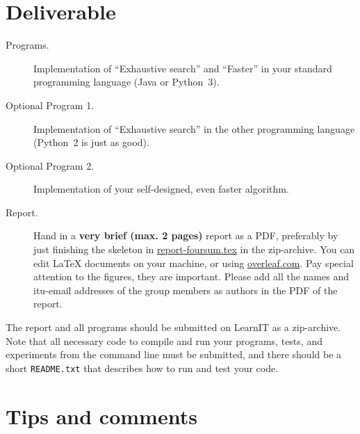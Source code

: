 \documentclass{tufte-handout}
\begin{document}
\section{Deliverable}
\begin{description}
  \item[Programs.] Implementation of ``Exhaustive search'' and ``Faster'' in your standard programming language (Java or Python~3).
  \item[Optional Program 1.] Implementation of ``Exhaustive search''  in the other programming language (Python~2 is just as good).
  \item[Optional Program 2.] Implementation of your self-designed, even faster algorithm.
  \item[Report.]
    Hand in a \textbf{very brief (max. 2 pages)} report as a PDF, preferably by just finishing the skeleton in \href{https://bitbucket.org/rikj/bads-labs/src/master/foursum/docs/report-foursum.tex}{report-foursum.tex} in the zip-archive. You can edit LaTeX documents on your machine, or using \href{https://www.overleaf.com/}{overleaf.com}. Pay special attention to the figures, they are important.
    Please add all the names and itu-email addresses of the group members as authors in the PDF of the report.
\end{description}
The report and all programs should be submitted on LearnIT as a zip-archive. Note that all necessary code to compile and run your programs, tests, and experiments from the command line must be submitted, and there should be a short \texttt{README.txt} that describes how to run and test your code.

\section{Tips and comments}
\end{document}
